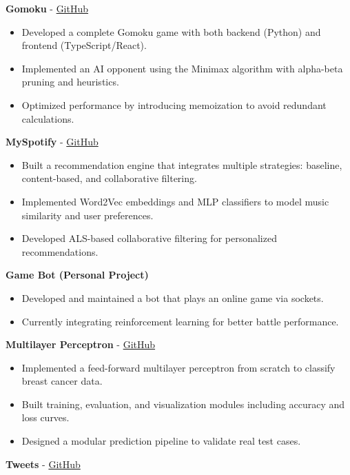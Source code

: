 \documentclass[a4paper,11pt]{article}%
\begin{document}
%
\noindent \textbf{Gomoku} - \href{https://github.com/sboof911/Gomoku}{GitHub}%
\begin{itemize}[leftmargin=2em,label={},parsep=0pt,topsep=1em]%
\item Developed a complete Gomoku game with both backend (Python) and frontend (TypeScript/React).%
\item Implemented an AI opponent using the Minimax algorithm with alpha-beta pruning and heuristics.%
\item Optimized performance by introducing memoization to avoid redundant calculations.%
\end{itemize}%
%
\noindent \textbf{MySpotify} - \href{https://github.com/sboof911/MySpotify}{GitHub}%
\begin{itemize}[leftmargin=2em,label={},parsep=0pt,topsep=1em]%
\item Built a recommendation engine that integrates multiple strategies: baseline, content-based, and collaborative filtering.%
\item Implemented Word2Vec embeddings and MLP classifiers to model music similarity and user preferences.%
\item Developed ALS-based collaborative filtering for personalized recommendations.%
\end{itemize}%
%
\noindent \textbf{Game Bot (Personal Project)}%
\begin{itemize}[leftmargin=2em,label={},parsep=0pt,topsep=1em]%
\item Developed and maintained a bot that plays an online game via sockets.%
\item Currently integrating reinforcement learning for better battle performance.%
\end{itemize}%
%
\noindent \textbf{Multilayer Perceptron} - \href{https://github.com/sboof911/Multilayer-Perceptron}{GitHub}%
\begin{itemize}[leftmargin=2em,label={},parsep=0pt,topsep=1em]%
\item Implemented a feed-forward multilayer perceptron from scratch to classify breast cancer data.%
\item Built training, evaluation, and visualization modules including accuracy and loss curves.%
\item Designed a modular prediction pipeline to validate real test cases.%
\end{itemize}%
%
\noindent \textbf{Tweets} - \href{https://github.com/sboof911/tweets}{GitHub}%
\end{document}
